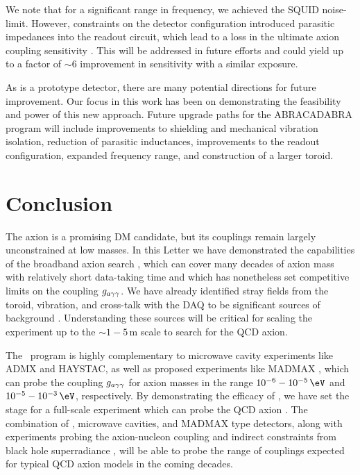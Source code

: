 \documentclass[aps,prl,amsmath,amssymb,reprint,superscriptaddress, nofootinbib,
]{revtex4-1}
\begin{document}
We note that for a significant range in frequency, we achieved the SQUID noise-limit. However, constraints on the detector configuration introduced parasitic impedances into the readout circuit, which lead to a loss in the ultimate axion coupling sensitivity \cite{ABRA_10cm_Technical}. This will be addressed in future efforts and could yield up to a factor of $\sim$6 improvement in sensitivity with a similar exposure.

As \abra is a prototype detector, there are many potential directions for future improvement. Our focus in this work has been on demonstrating the feasibility and power of this new approach. Future upgrade paths for the ABRACADABRA program will include improvements to shielding and mechanical vibration isolation, reduction of parasitic inductances, improvements to the readout configuration, expanded frequency range, and construction of a larger toroid. 


 
\section{Conclusion}
The axion is a promising DM candidate, but its couplings remain largely unconstrained at low masses. In this Letter we have demonstrated the capabilities of the broadband axion search \abra, which can cover many decades of axion mass with relatively short data-taking time and which has nonetheless set competitive limits on the coupling $g_{a\gamma\gamma}$. We have already identified stray fields from the toroid, vibration, and cross-talk with the DAQ to be significant sources of background \cite{ABRA_10cm_Technical}. Understanding these sources will be critical for scaling the experiment up to the $\sim 1-5$\,m scale to search for the QCD axion.

The \ABRA\ program is highly complementary to microwave cavity experiments like ADMX and HAYSTAC, as well as proposed experiments like MADMAX \cite{TheMADMAXWorkingGroup:2016hpc}, which can probe the coupling $g_{a\gamma\gamma}$ for axion masses in the range $10^{-6}-10^{-5}\,\eV$ and $10^{-5}-10^{-3}\,\eV$, respectively. By demonstrating the efficacy of \abra, we have set the stage for a full-scale experiment which can probe the QCD axion \cite{ABRA_10cm_Technical}. The combination of \ABRA, microwave cavities, and MADMAX type detectors, along with experiments probing the axion-nucleon coupling \cite{PhysRevX.4.021030} and indirect constraints from black hole superradiance \cite{Arvanitaki:2014wva,Arvanitaki:2016qwi}, will be able to probe the range of couplings expected for typical QCD axion models in the coming decades.
\end{document}
